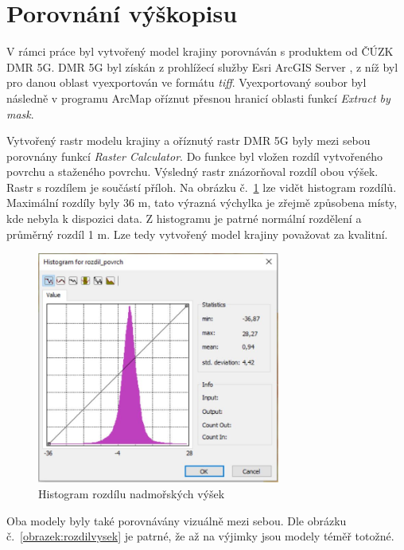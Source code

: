 \documentclass[thesis=M,czech]{FITthesis}[2012/06/26]
\begin{document}
\section{Porovnání výškopisu}
V rámci práce byl vytvořený model krajiny porovnáván s produktem od ČÚZK DMR 5G. DMR 5G byl získán z prohlížecí služby Esri ArcGIS Server \cite{dmr}, z níž byl pro danou oblast vyexportován ve formátu \textit{tiff}. Vyexportovaný soubor byl následně v programu ArcMap oříznut přesnou hranicí oblasti funkcí \textit{Extract by mask}. 

Vytvořený rastr modelu krajiny a oříznutý rastr DMR 5G byly mezi sebou porovnány funkcí \textit{Raster Calculator}. Do funkce byl vložen rozdíl vytvořeného povrchu a staženého povrchu. Výsledný rastr znázorňoval rozdíl obou výšek. Rastr s rozdílem je součástí příloh. Na obrázku č.~\ref{obrazek:histogram} lze vidět histogram rozdílů. Maximální rozdíly byly 36 m, tato výrazná výchylka je zřejmě způsobena místy, kde nebyla k dispozici data. Z histogramu je patrné normální rozdělení a průměrný rozdíl 1 m. Lze tedy vytvořený model krajiny považovat za kvalitní. 

\begin{figure}[h]
	\centering
	\includegraphics[width=8cm]{pics/histogram.jpg}
	\caption{Histogram rozdílu nadmořských výšek}
	\label{obrazek:histogram}
\end{figure}

Oba modely byly také porovnávány vizuálně mezi sebou. Dle obrázku č.~\ref{obrazek:rozdilvysek} je patrné, že až na výjimky jsou modely téměř totožné. 
\end{document}
